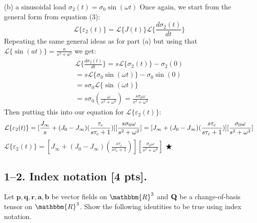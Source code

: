 \medskip
(b) a sinusoidal load $\sigma_2(t) = \sigma_0  \sin(\omega t)$ \newline
Once again, we start from the general form from equation (3):
\begin{equation}
        \mathcal{L}\{\varepsilon_2(t)\} = \mathcal{L}\{J(t)\} \mathcal{L}\{\frac{d\sigma_2(t)}{dt}\}
\end{equation}
Repeating the same general ideas as for part (a) but using that $\mathcal{L}\{ \sin(at)\} = \frac{a}{s^2 + a^2}$ we get:
\begin{equation}
\begin{split}
    \mathcal{L}\{\frac{d\sigma_2(t)}{dt}\} = s\mathcal{L}\{ \sigma_2(t)\}-\sigma_2(0) \\
    = s\mathcal{L}\{ \sigma_0\sin(\omega t)\}-\sigma_0\sin(0) \\ 
    = s\sigma_0\mathcal{L}\{ \sin(\omega t)\} \\
    = s \sigma_0 (\frac{\omega}{s^2 + \omega^2}) = \frac{s \sigma_0 \omega}{s^2 + \omega^2}
\end{split}
\end{equation}
Then putting this into our equation for $\mathcal{L}\{\varepsilon_2(t)\}$:
\begin{equation}
    \mathcal{L}\{\varepsilon_2(t)\} = [\frac{J_\infty}{s} + (J_0-J_\infty)(\frac{\tau_c}{s\tau_c+1})][\frac{s \sigma_0 \omega}{s^2 + \omega^2}] \\
    =[J_\infty + (J_0-J_\infty)(\frac{s \tau_c}{s\tau_c+1})][\frac{\sigma_0 \omega}{s^2 + \omega^2}]
\end{equation}
\hspace*{\fill} $\mathcal{L}\{\varepsilon_2(t)\} = [J_\infty + (J_0-J_\infty)(\frac{s \tau_c}{s\tau_c+1})][\frac{\sigma_0 \omega}{s^2 + \omega^2}]$ $\space \bigstar$


\newpage
\bigskip
\subsection*{1--2. \textbf{Index notation} [4 pts].} Let $\bm{p}, \bm{q}, \bm{r}, \bm{a}, \bm{b}$ be vector fields on $\mathbbm{R}^3$ and $\mathbf{Q}$ be a change-of-basis tensor on $\mathbbm{R}^3$. Show the following identities to be true using index notation. 

